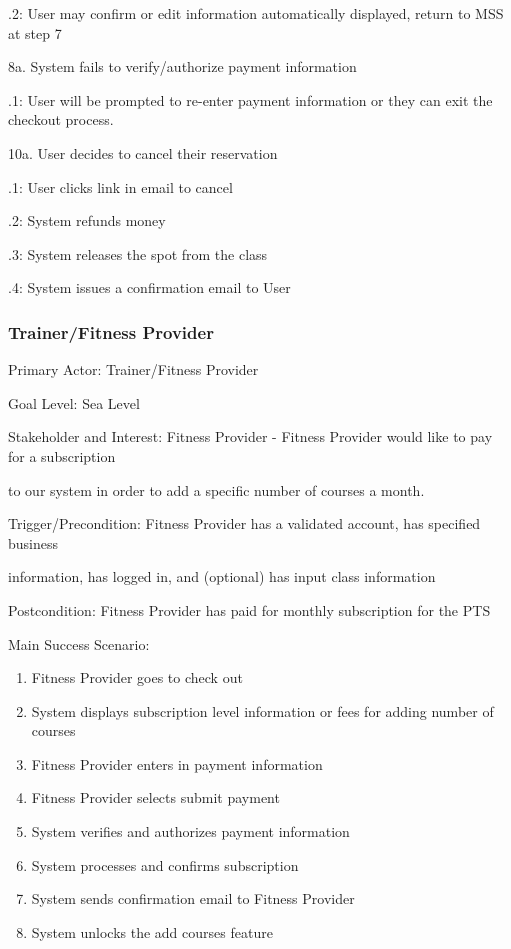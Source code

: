 \documentclass[12pt]{article}
\begin{document}
	.2: User may confirm or edit information automatically displayed, return to MSS at step 7

\noindent 8a. System fails to verify/authorize payment information
	
	.1: User will be prompted to re-enter payment information or they can exit the checkout process. 

\noindent 10a. User decides to cancel their reservation
	
	.1: User clicks link in email to cancel

	.2: System refunds money 

	.3: System releases the spot from the class

	.4: System issues a confirmation email to User

\subsubsection{Trainer/Fitness Provider}
\noindent Primary Actor: Trainer/Fitness Provider

\noindent Goal Level: Sea Level
\newline

\noindent Stakeholder and Interest: Fitness Provider - Fitness Provider would like to pay for a subscription 

to our system in order to add a specific number of courses a month.
\newline

\noindent Trigger/Precondition: Fitness Provider has a validated account, has specified business 

information, has logged in, and (optional) has input class information

\noindent Postcondition: Fitness Provider has paid for monthly subscription for the PTS
\newline

\noindent Main Success Scenario: 
\begin{enumerate}
\item Fitness Provider goes to check out
\item System displays subscription level information or fees for adding number of courses
\item Fitness Provider enters in payment information 
\item Fitness Provider selects submit payment
\item System verifies and authorizes payment information
\item System processes and confirms subscription
\item System sends confirmation email to Fitness Provider
\item System unlocks the add courses feature
\end{enumerate}
\end{document}
